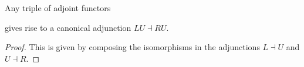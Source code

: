 \documentclass{amsart}
\begin{document}
\begin{lem}
  Any triple of adjoint functors
  
  gives rise to a canonical adjunction $LU \dashv RU$.
\end{lem}
\begin{proof}
  This is given by composing the isomorphisms in the adjunctions $L \dashv U$ and $U \dashv R$.
  
\end{proof}



\end{document}
